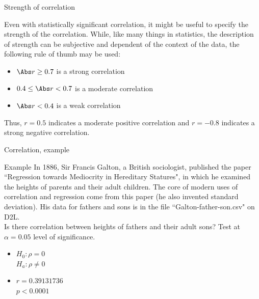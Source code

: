 \documentclass[xcolor=table]{beamer}
\begin{document}
\begin{frame}{Strength of correlation}
\begin{block}{}
\large
Even with statistically significant correlation, it might be useful to specify the strength of the correlation. While, like many things in statistics, the description of strength can be subjective and dependent of the context of the data, the following rule of thumb may be used:
\begin{itemize}
\pause\item $\Abs r \ge 0.7$ is a strong correlation
\pause\item $0.4 \le \Abs r < 0.7$ is a moderate correlation
\pause\item $\Abs r < 0.4$ is a weak correlation
\end{itemize}
\pause Thus, $r=0.5$ indicates a moderate positive correlation and $r=-0.8$ indicates a strong negative correlation.
\end{block}
\end{frame}


\begin{frame}{Correlation, example}
\begin{exampleblock}{Example}
In 1886, Sir Francis Galton, a British sociologist, published the paper ``Regression towards Mediocrity in Hereditary Statures", in which he examined the heights of parents and their adult children. The core of modern uses of correlation and regression come from this paper (he also invented standard deviation). His data for fathers and sons is in the file ``Galton-father-son.csv" on D2L.\\
\medskip
Is there correlation between heights of fathers and their adult sons? Test at $\alpha = 0.05$ level of significance.
\begin{itemize}
\pause\item $H_0: \rho = 0$\\$H_a: \rho \ne 0$ 
\pause\item $r = 0.39131736$ \\ $p < 0.0001$
\end{itemize} 
\end{exampleblock}
\end{frame}
\end{document}
